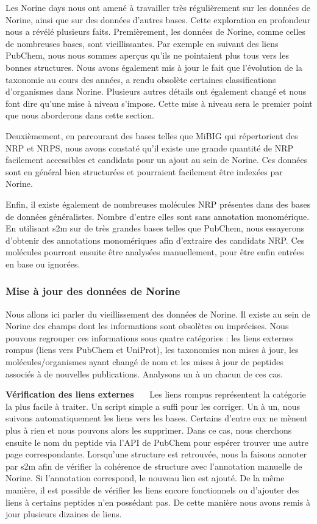 Les Norine days nous ont amené à travailler très régulièrement sur les données de Norine, ainsi que sur des données d'autres bases.
Cette exploration en profondeur nous a révélé plusieurs faits.
Premièrement, les données de Norine, comme celles de nombreuses bases, sont vieillissantes.
Par exemple en suivant des liens PubChem, nous nous sommes aperçus qu'ils ne pointaient plus tous vers les bonnes structures.
Nous avons également mis à jour le fait que l'évolution de la taxonomie au cours des années, a rendu obsolète certaines classifications d'organismes dans Norine.
Plusieurs autres détails ont également changé et nous font dire qu'une mise à niveau s'impose.
Cette mise à niveau sera le premier point que nous aborderons dans cette section.

Deuxièmement, en parcourant des bases telles que MiBIG qui répertorient des NRP et NRPS, nous avons constaté qu'il existe une grande quantité de NRP facilement accessibles et candidats pour un ajout au sein de Norine.
Ces données sont en général bien structurées et pourraient facilement être indexées par Norine.

Enfin, il existe également de nombreuses molécules NRP présentes dans des bases de données généralistes.
Nombre d'entre elles sont sans annotation monomérique.
En utilisant s2m sur de très grandes bases telles que PubChem, nous essayerons d'obtenir des annotations monomériques afin d'extraire des candidats NRP.
Ces molécules pourront ensuite être analysées manuellement, pour être enfin entrées en base ou ignorées.


\subsubsection{Mise à jour des données de Norine}

Nous allons ici parler du vieillissement des données de Norine.
Il existe au sein de Norine des champs dont les informations sont obsolètes ou imprécises.
Nous pouvons regrouper ces informations sous quatre catégories : les liens externes rompus (liens vers PubChem et UniProt), les taxonomies non mises à jour, les molécules/organismes ayant changé de nom et les mises à jour de peptides associés à de nouvelles publications.
Analysons un à un chacun de ces cas.


\textbf{Vérification des liens externes}~~~
Les liens rompus représentent la catégorie la plus facile à traiter.
Un script simple a suffi pour les corriger.
Un à un, nous suivons automatiquement les liens vers les bases.
Certains d'entre eux ne mènent plus à rien et nous pouvons alors les supprimer.
Dans ce cas, nous cherchons ensuite le nom du peptide via l'API de PubChem pour espérer trouver une autre page correspondante.
Lorsqu'une structure est retrouvée, nous la faisons annoter par s2m afin de vérifier la cohérence de structure avec l'annotation manuelle de Norine.
Si l'annotation correspond, le nouveau lien est ajouté.
De la même manière, il est possible de vérifier les liens encore fonctionnels ou d'ajouter des liens à certains peptides n'en possédant pas.
De cette manière nous avons remis à jour plusieurs dizaines de liens.


